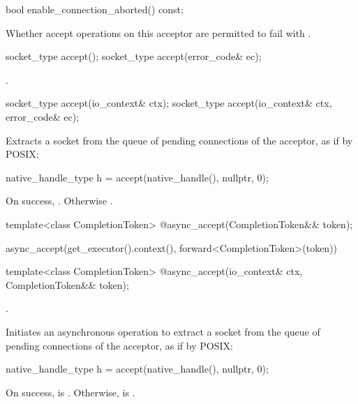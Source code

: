 \begin{itemdecl}
bool enable_connection_aborted() const;
\end{itemdecl}

\begin{itemdescr}
\pnum
\returns Whether accept operations on this acceptor are permitted to fail with .
\end{itemdescr}

\begin{itemdecl}
socket_type accept();
socket_type accept(error_code& ec);
\end{itemdecl}

\begin{itemdescr}
\pnum
\returns {}.
\end{itemdescr}

\begin{itemdecl}
socket_type accept(io_context& ctx);
socket_type accept(io_context& ctx, error_code& ec);
\end{itemdecl}

\begin{itemdescr}
\pnum
\effects Extracts a socket from the queue of pending connections of the acceptor, as if by POSIX:
\begin{codeblock}
native_handle_type h = accept(native_handle(), nullptr, 0);
\end{codeblock}


\pnum
\returns On success, . Otherwise .
\end{itemdescr}

\begin{itemdecl}
template<class CompletionToken>
  @\DEDUCED@ async_accept(CompletionToken&& token);
\end{itemdecl}

\begin{itemdescr}
\pnum
\returns
\begin{codeblock}
async_accept(get_executor().context(), forward<CompletionToken>(token))
\end{codeblock}
\end{itemdescr}

\begin{itemdecl}
template<class CompletionToken>
  @\DEDUCED@ async_accept(io_context& ctx, CompletionToken&& token);
\end{itemdecl}

\begin{itemdescr}
\pnum
\completionsig {}.

\pnum
\effects Initiates an asynchronous operation to extract a socket from the queue of pending connections of the acceptor, as if by POSIX:
\begin{codeblock}
native_handle_type h = accept(native_handle(), nullptr, 0);
\end{codeblock}
 On success,  is . Otherwise,  is .
\end{itemdescr}

